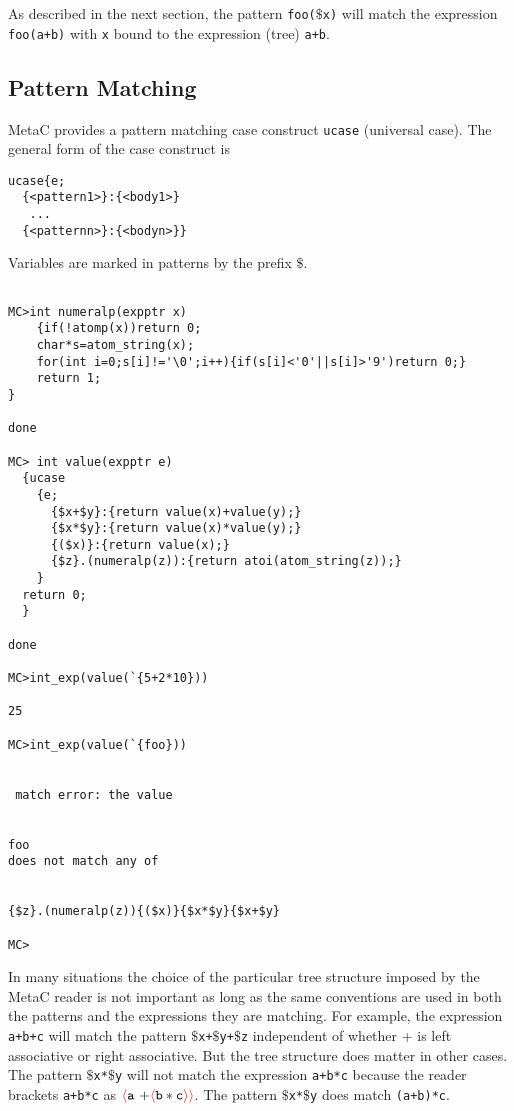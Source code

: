 \documentclass{article}
\newcommand{\fopen}{{\color{red} \langle}}
\newcommand{\fclose}{{\color{red} \rangle}}
\begin{document}
As described in the next section, the pattern {\tt foo($\$$x)} will match the expression {\tt foo(a+b)} with {\tt x} bound to the expression (tree) {\tt a+b}.

\subsection{Pattern Matching}

MetaC provides a pattern matching case construct {\tt ucase} (universal case).
The general form of the case construct is

\begin{verbatim}
ucase{e;
  {<pattern1>}:{<body1>}
   ...
  {<patternn>}:{<bodyn>}}
\end{verbatim}

Variables are marked in patterns by the prefix $\$$.

\begin{verbatim}

MC>int numeralp(expptr x)
    {if(!atomp(x))return 0;
    char*s=atom_string(x);
    for(int i=0;s[i]!='\0';i++){if(s[i]<'0'||s[i]>'9')return 0;}
    return 1;
}

done

MC> int value(expptr e)
  {ucase
    {e;
      {$x+$y}:{return value(x)+value(y);}
      {$x*$y}:{return value(x)*value(y);}
      {($x)}:{return value(x);}
      {$z}.(numeralp(z)):{return atoi(atom_string(z));}
    }
  return 0;
  }

done

MC>int_exp(value(`{5+2*10}))

25

MC>int_exp(value(`{foo}))


 match error: the value 


foo
does not match any of


{$z}.(numeralp(z)){($x)}{$x*$y}{$x+$y}

MC>
\end{verbatim}

In many situations the choice of the particular tree structure imposed by the MetaC reader is not important as long as the same conventions are used in both the patterns and the expressions
they are matching.  For example, the expression {\tt a+b+c} will match the pattern
{\tt $\$$x+$\$$y+$\$$z} independent of whether + is left associative or right associative.  But the tree structure does matter in other cases.  The pattern {\tt $\$$x*$\$$y}
will not match the expression {\tt a+b*c} because the reader brackets {\tt a+b*c} as  $\fopen \mathtt{a~+} \fopen \mathtt{b * c} \fclose\fclose$. The pattern {\tt $\$$x*$\$$y} does match {\tt (a+b)*c}.
\end{document}
